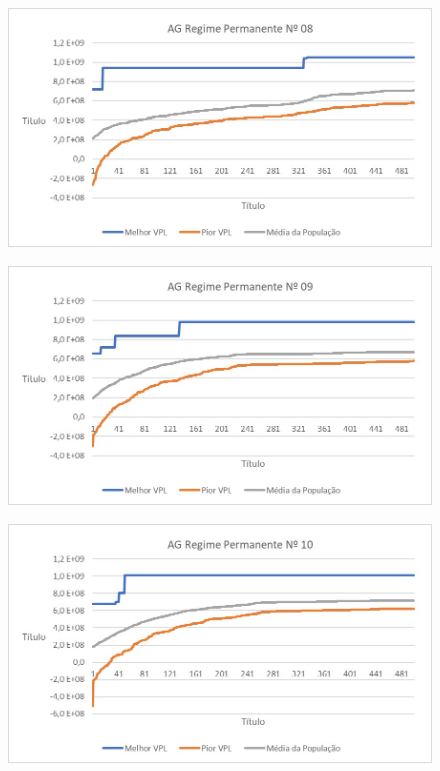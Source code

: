 \documentclass[12pt,a4paper]{report}
\begin{document}
\begin{figure}[H]
\centering

\includegraphics[scale=1]{ApC/AGRP/8}

\end{figure}
\begin{figure}[H]
\centering

\includegraphics[scale=1]{ApC/AGRP/9}

\end{figure}
\begin{figure}[H]
\centering

\includegraphics[scale=1]{ApC/AGRP/10}

\end{figure}
\end{document}

